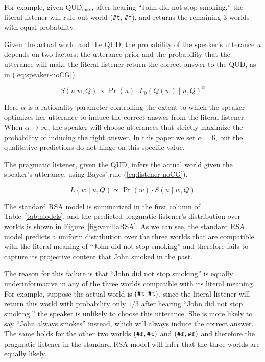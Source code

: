 For example, given QUD$_\textrm{max}$, after hearing
 ``John did not stop smoking,'' the literal listener will rule out world
 (\verb+#t+, \verb+#f+), and returns the remaining 3 worlds with equal probability.


Given the actual world and the QUD, the probability of 
 the speaker's utterance $u$ depends on two factors: the utterance prior 
 and the probability that the utterance will make the literal listener 
 return the correct answer to the QUD, as in (\ref{eq:speaker-noCG}).
 
\begin{equation}
S(u | w, Q) \propto \Pr(u) \cdot L_0(Q(w) \mid u, Q)^\alpha 
\label{eq:speaker-noCG}
\end{equation}

Here $\alpha$ is a rationality parameter controlling the extent to which 
 the speaker optimizes her utterance to induce the correct answer from the 
 literal listener. 
When $\alpha \rightarrow \infty$, the speaker will choose utterances that 
 strictly maximize the probability of inducing the right answer.
In this paper we set $\alpha=6$, but the qualitative predictions do not hinge on 
 this specific value.

The pragmatic listener, given the QUD, infers the actual world given the speaker's utterance, using Bayes' rule (\ref{eq:listener-noCG}).

\begin{equation}
L(w \mid u, Q) \propto \Pr(w) \cdot S(u \mid w, Q) \label{eq:listener-noCG}
\end{equation}

The standard RSA model is summarized in the first column of Table~\ref{tab:models},
 and the predicted pragmatic listener's distribution over worlds is shown in Figure~\ref{fig:vanillaRSA}.
As we can see, the standard RSA model predicts a uniform distribution over the
 three worlds that are compatible with the literal meaning of 
 ``John did not stop smoking'' and therefore fails to capture its projective content
 that John smoked in the past.

The reason for this failure is that ``John did not stop smoking'' is equally
 underinformative in any of the three worlds compatible with its literal meaning.
For example, suppose the actual world is $(\verb+#t+, \verb+#t+)$, since the 
 literal listener will return this world with probability only $1/3$ after hearing ``John did not stop smoking,'' the speaker is unlikely to choose this utterance.
She is more likely to say ``John always smokes'' instead, which will always induce 
 the correct answer. 
The same holds for the other two worlds $(\verb+#f+, \verb+#t+)$ and $(\verb+#f+,
 \verb+#f+)$ and therefore the pragmatic listener in the standard RSA model will 
 infer that the three worlds are equally likely.
 

